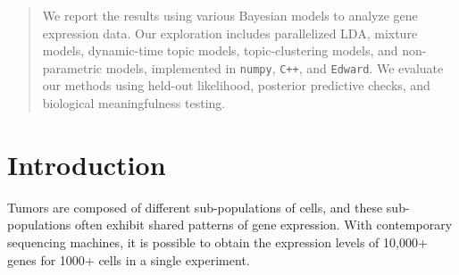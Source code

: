 \documentclass{article}
\begin{document}
 


\begin{abstract} 
    We report the results using various Bayesian models to analyze gene expression data. Our exploration includes parallelized LDA, mixture models, dynamic-time topic models, topic-clustering models, and non-parametric models, implemented in \texttt{numpy}, \texttt{C++}, and \texttt{Edward}. We evaluate our methods using held-out likelihood, posterior predictive checks, and biological meaningfulness testing.
\end{abstract} 

\section{Introduction}
\label{intro}

Tumors are composed of different sub-populations of cells, and these sub-populations often exhibit shared patterns of gene expression. With contemporary sequencing machines, it is possible to obtain the expression levels of 10,000+ genes for 1000+ cells in a single experiment. 
\end{document}
